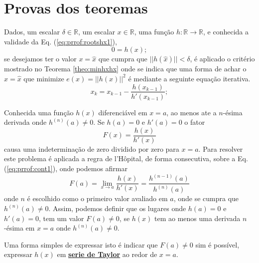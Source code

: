 \section{Provas dos teoremas}
 
\begin{myproofT}\label{proof:theo:rootshx}
Dados,
um escalar $\delta \in \mathbb{R}$, 
um escalar $x \in \mathbb{R}$, 
uma função $h:\mathbb{R} \rightarrow \mathbb{R}$, e 
conhecida a validade da Eq. (\ref{eq:prrof:rootshx1}),
\begin{equation}\label{eq:prrof:rootshx1}
0=h(x);
\end{equation}
se desejamos ter o valor $x=\hat{x}$ que cumpra que $||h(\hat{x})||<\delta$, 
é aplicado o critério mostrado no Teorema \ref{theo:minhxhx} onde se indica que uma forma de achar o 
$x=\hat{x}$ que minimize $e(x)=||h(x)||^2$ é mediante a seguinte equação iterativa.  
\begin{equation}\label{eq:prrof:rootshx1:2}
x_{k}=x_{k-1}-\frac{h(x_{k-1})}{h'(x_{k-1})};
\end{equation}

\end{myproofT}

\begin{myproofT}\label{proof:theo:cont:rootshx}
Conhecida uma função $h(x)$  diferenciável em $x=a$, ao menos ate a $n$-ésima derivada onde $h^(n)(a)\neq 0$.
Se $h(a)=0$ e $h'(a)=0$ o fator
\begin{equation}\label{eq:prrof:cont1}
F(x)=\frac{h(x)}{h'(x)}
\end{equation}
causa uma indeterminação de zero dividido por zero para $x=a$.
Para resolver este problema é aplicada a regra de l'Hôpital, de forma consecutiva,
sobre a Eq. (\ref{eq:prrof:cont1}), onde podemos afirmar
\begin{equation}\label{eq:prrof:cont2}
F(a)=\lim_{x\rightarrow a}\frac{h(x)}{h'(x)}=\frac{h^{(n-1)}(a)}{h^{(n)}(a)}
\end{equation}
onde $n$ é escolhido como o primeiro valor avaliado em $a$, 
onde se cumpra que $h^{(n)}(a)\neq 0$. 
Assim, podemos definir que os lugares onde $h(a)=0$ e $h'(a)=0$,
 tem um valor $F(a)\neq 0$,
se $h(x)$ tem ao menos uma derivada $n$-ésima em $x=a$ onde $h^{(n)}(a)\neq 0$.

Uma forma simples de expressar isto é indicar que $F(a)\neq 0$ sim é possível,
expressar $h(x)$ em \hyperref[def:taylor]{\textbf{serie de Taylor}} ao redor de $x=a$. 
\end{myproofT}

